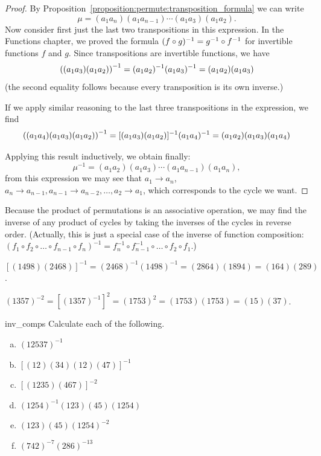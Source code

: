 \begin{proof}
By Proposition~\ref{proposition:permute:transposition_formula} we can write 
\[ \mu = (a_1 a_n ) (a_1 a_{n-1} ) \cdots ( a_1 a_3) (a_1 a_2).
\]
Now consider first just the last two transpositions in this expression.
In the Functions chapter, we proved the formula  $(f \circ g)^{-1} = g^{-1} \circ f^{-1}$ for invertible functions $f$ and $g$.
Since transpositions are invertible functions, we have
\[
{\large(}(a_1 a_3)(a_1 a_2){\large)}^{-1} = (a_1 a_2)^{-1} ( a_1 a_3)^{-1} = (a_1 a_2 ) (a_1 a_3 ) \]
(the second equality follows because every transposition is its own inverse.)

If we apply similar reasoning to the last three transpositions in the expression, we find
\[
{\large(}(a_1 a_4)(a_1 a_3)(a_1 a_2){\large)}^{-1} = [(a_1 a_3)(a_1 a_2)]^{-1} ( a_1 a_4)^{-1} = (a_1 a_2 ) (a_1 a_3 ) (a_1 a_4) \]

 Applying this result inductively, we obtain finally: 
\[
\mu^{-1} = (a_1 a_2) ( a_1 a_3) \cdots (a_1 a_{n-1} ) (a_1 a_n ), \]
from this expression we may see that $a_1 \rightarrow a_n$, $a_n \rightarrow a_{n-1}, a_{n-1} \rightarrow a_{n-2}, \ldots, a_{2} \rightarrow a_{1}$, which 
corresponds to the cycle we want.
\end{proof}

Because the product of permutations is an associative operation, we may find the inverse of any product of cycles by taking the inverses of the cycles in reverse order. (Actually, this is just a special case of the inverse of function composition: $(f_1 \circ f_2 \circ \ldots \circ f_{n-1}\circ f_n)^{-1}= f_n^{-1} \circ f_{n-1}^{-1} \circ \ldots  \circ f_2 \circ f_1 $.)

\begin{example}{}
$\left[ ( 1 4 9 8 )( 2 4 6 8 ) \right] ^{-1} = ( 2 4 6 8 )^{-1}( 1 4 9 8 )^{-1} = ( 2 8 6 4 )(1 8 9 4) = ( 1 6 4)( 2 8 9)$. 
\end{example}

\begin{example}{}
$( 1 3 5 7) ^{-2} = \left[ ( 1 3 5 7 )^{-1} \right]^2 = ( 1 7  5 3 )^2 = ( 1 7 5 3 )(1 7 5 3) = ( 1 5 )(3 7)$. 
\end{example}


\begin{exercise}{inv_comps}
Calculate each of the following.
\begin{multicols}{2}
\begin{enumerate}[(a)]    
\item
$(1 2 5 3 7)^{-1}$
 \item
$[(1 2)(3 4)(1 2)(4 7)]^{-1}$
\item
$[( 1 2 3 5 )( 4 6 7 )]^{-2}$
\item
$( 1 2 5 4 )^{-1} ( 1 2 3 )( 4 5 ) ( 1 2 5 4 )$
\item
$( 1 2 3 )( 4 5 ) ( 1 2 5 4 )^{-2}$
\item
$( 7 4 2 )^{-7} ( 2 8 6)^{-13}$

 \end{enumerate}
\end{multicols}
\end{exercise}


